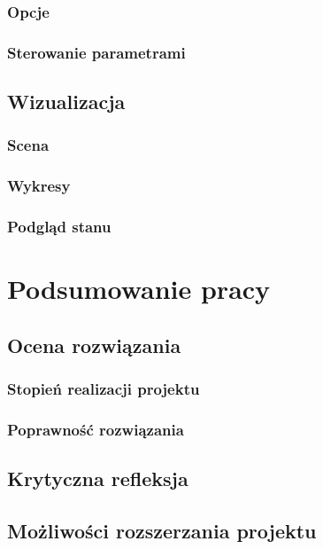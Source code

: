\documentclass[12pt, oneside]{report}
\theoremstyle{definition}
\begin{document}
\subsection{Opcje}
\subsection{Sterowanie parametrami}
\section{Wizualizacja}
\subsection{Scena}
\subsection{Wykresy}
\subsection{Podgląd stanu}
	
\newpage
\chapter{Podsumowanie pracy}
\section{Ocena rozwiązania}
\subsection{Stopień realizacji projektu}
\subsection{Poprawność rozwiązania}
\section{Krytyczna refleksja}
\section{Możliwości rozszerzania projektu}
\end{document}
